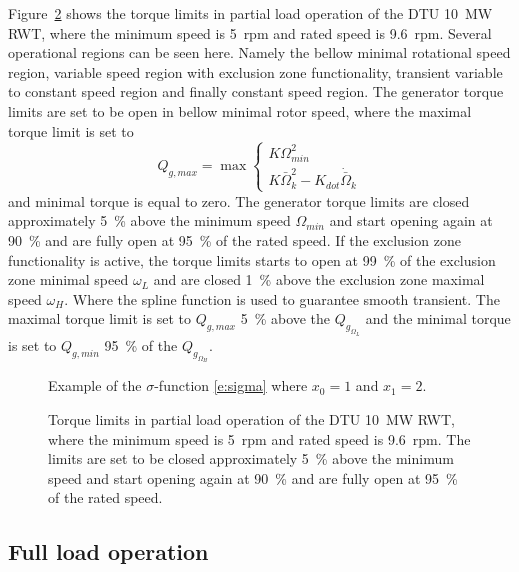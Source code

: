 Figure~\ref{f:torque_limits} shows the torque limits in partial load operation of the DTU 10~MW RWT, where the minimum speed is 5~rpm and rated speed is 9.6~rpm. Several operational regions can be seen here. Namely the bellow minimal rotational speed region, variable speed region with exclusion zone functionality, transient variable to constant speed region and finally constant speed region. The generator torque limits are set to be open in bellow minimal rotor speed, where the maximal torque limit is set to
\begin{equation}\label{e:Tg_blw_min_w}
Q_{g,max} = \max\left\{
\begin{array}{l}
K \Omega_{min}^2 \\
K \bar\Omega_k^2 - K_{dot} \dot{\bar \Omega}_k
\end{array} \right.
\end{equation}
and minimal torque is equal to zero. The generator torque limits are closed approximately 5~\% above the minimum speed $\Omega_{min}$ and start opening again at 90~\% and are fully open at 95~\% of the rated speed. If the exclusion zone functionality is active, the torque limits starts to open at 99~\% of the exclusion zone minimal speed $\omega_{L}$ and are closed  1~\% above the exclusion zone maximal speed $\omega_{H}$. Where the spline function is used to guarantee smooth transient. The maximal torque limit is set to $Q_{g,max}$ 5~\% above the $Q_{g_{\Omega_{L}}}$ and the minimal torque is set to $Q_{g,min}$ 95~\% of the $Q_{g_{\Omega_{H}}}$.

\begin{figure}[t]
\centerline{ }
\caption{Example of the $\sigma$-function \eqref{e:sigma} where $x_0=1$ and $x_1=2$. \label{f:sigma}}
\end{figure}

\begin{figure}[t]
\centerline{
 }
\caption{Torque limits in partial load operation of the DTU 10~MW RWT, where the minimum speed is 5~rpm and rated speed is 9.6~rpm. The limits are set to be closed approximately 5~\% above the minimum speed and start opening again at 90~\% and are fully open at 95~\% of the rated speed. \label{f:torque_limits}}
\end{figure}

\subsection{Full load operation}

